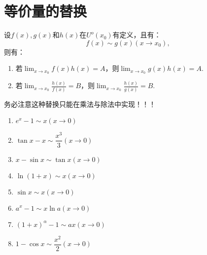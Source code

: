 \section{等价量的替换}

\begin{theorem}[等价量的替换]
	设$f(x),g(x)$和$h(x)$在$U^o(x_0)$有定义，且有：
	\begin{equation}
		f(x)\sim g(x)(x\rightarrow x_0),
	\end{equation}
	则有：
	\begin{enumerate}
		\item 若$\displaystyle\lim_{x\to x_0}f(x)h(x)=A$，则$\displaystyle\lim_{x\to x_0}g(x)h(x)=A$.
		\item 若$\displaystyle\lim_{x\to x_0}\frac{h(x)}{f(x)}=B$，则$\displaystyle\lim_{x\to x_0}\frac{h(x)}{g(x)}=B$.
	\end{enumerate}
\end{theorem}

务必注意这种替换只能在乘法与除法中实现！！！

\begin{proposition}
	\begin{enumerate}
		\item $e^x-1\sim x(x\rightarrow 0)$
		\item $\tan{x}-x\sim\dfrac{x^3}{3}(x\rightarrow 0)$
		\item $x-\sin{x}\sim\tan{x}(x\rightarrow 0)$
		\item $\ln(1+x)\sim x(x\rightarrow 0)$
		\item $\sin{x}\sim x(x\rightarrow 0)$
		\item $a^x-1\sim x\ln a(x\rightarrow 0)$
		\item $(1+x)^{\alpha}-1\sim ax(x\rightarrow 0)$
		\item $1-\cos{x}\sim \dfrac{x^2}{2}(x\rightarrow 0)$
	\end{enumerate}
\end{proposition}